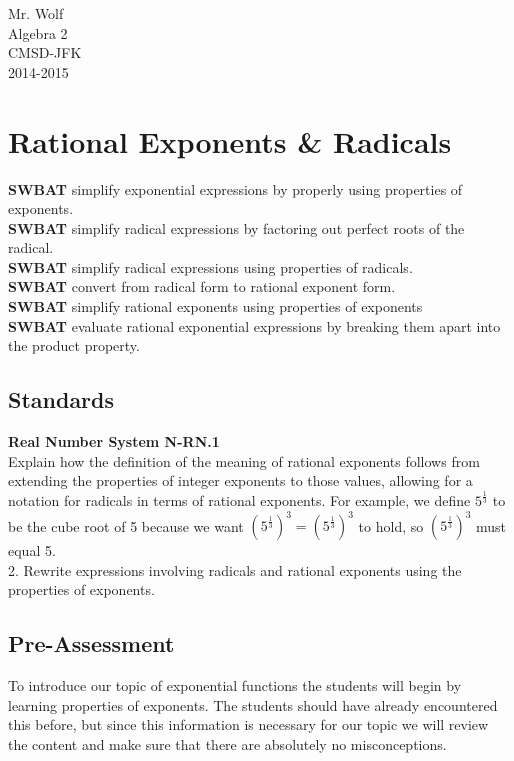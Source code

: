 \documentclass[12pt]{article}
\begin{document}
Mr. Wolf \\ Algebra 2 \\ CMSD-JFK\\2014-2015



\section*{Rational Exponents \& Radicals}



	\textbf{SWBAT} simplify exponential expressions by properly using properties of exponents.\\
	
	\textbf{SWBAT} simplify radical expressions by factoring out perfect roots of the radical.\\
	
	\textbf{SWBAT} simplify radical expressions using properties of radicals.\\
	
	\textbf{SWBAT} convert from radical form to rational exponent form.\\
	
	\textbf{SWBAT} simplify rational exponents using properties of exponents\\
	
	\textbf{SWBAT} evaluate rational exponential expressions by breaking them apart into the product property.
	


\subsection*{Standards}
	\textbf{Real Number System \hfill N-RN.1}\\
	
	 Explain how the definition of the meaning of rational exponents follows from extending the properties of integer exponents to those values, allowing for a notation for radicals in terms of rational exponents. For example, we define $5^{\frac{1}{3}}$ to be the cube root of 5 because we want $\left(5^{\frac{1}{3}}\right)^{3} =\left(5^{\frac{1}{3}}\right)^{3}$ to hold, so $\left(5^{\frac{1}{3}}\right)^{3}$ must equal 5. \\
	
2.	 Rewrite expressions involving radicals and rational exponents using the properties of exponents.
	



\subsection*{Pre-Assessment} To introduce our topic of exponential functions the students will begin by learning properties of exponents. The students should have already encountered this before, but since this information is necessary for our topic we will review the content and make sure that there are absolutely no misconceptions.  
	
\end{document}
